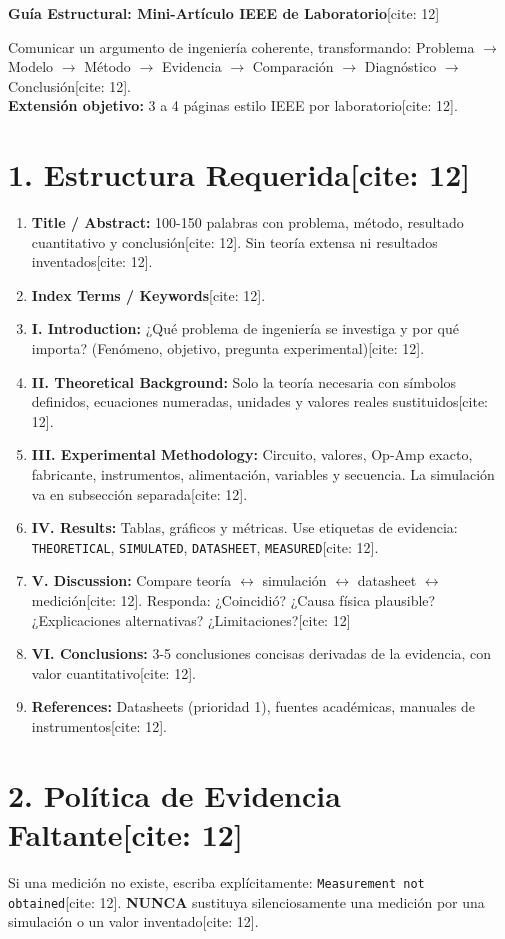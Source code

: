\documentclass[11pt, a4paper]{article}
\begin{document}
\begin{center}
    \Large\textbf{\textcolor{ucbblue}{Guía Estructural: Mini-Artículo IEEE de Laboratorio}}[cite: 12]
\end{center}

\begin{tcolorbox}[colback=white, colframe=ucbblue, title=\textbf{Propósito del Informe[cite: 12]}]
    Comunicar un argumento de ingeniería coherente, transformando: Problema $\rightarrow$ Modelo $\rightarrow$ Método $\rightarrow$ Evidencia $\rightarrow$ Comparación $\rightarrow$ Diagnóstico $\rightarrow$ Conclusión[cite: 12]. \\
    \textbf{Extensión objetivo:} 3 a 4 páginas estilo IEEE por laboratorio[cite: 12].
\end{tcolorbox}

\section*{1. Estructura Requerida[cite: 12]}
\begin{enumerate}
    \setlength{\itemsep}{0pt}
    \item \textbf{Title / Abstract:} 100-150 palabras con problema, método, resultado cuantitativo y conclusión[cite: 12]. Sin teoría extensa ni resultados inventados[cite: 12].
    \item \textbf{Index Terms / Keywords}[cite: 12].
    \item \textbf{I. Introduction:} ¿Qué problema de ingeniería se investiga y por qué importa? (Fenómeno, objetivo, pregunta experimental)[cite: 12].
    \item \textbf{II. Theoretical Background:} Solo la teoría necesaria con símbolos definidos, ecuaciones numeradas, unidades y valores reales sustituidos[cite: 12].
    \item \textbf{III. Experimental Methodology:} Circuito, valores, Op-Amp exacto, fabricante, instrumentos, alimentación, variables y secuencia. La simulación va en subsección separada[cite: 12].
    \item \textbf{IV. Results:} Tablas, gráficos y métricas. Use etiquetas de evidencia: \texttt{THEORETICAL}, \texttt{SIMULATED}, \texttt{DATASHEET}, \texttt{MEASURED}[cite: 12].
    \item \textbf{V. Discussion:} Compare teoría $\leftrightarrow$ simulación $\leftrightarrow$ datasheet $\leftrightarrow$ medición[cite: 12]. Responda: ¿Coincidió? ¿Causa física plausible? ¿Explicaciones alternativas? ¿Limitaciones?[cite: 12]
    \item \textbf{VI. Conclusions:} 3-5 conclusiones concisas derivadas de la evidencia, con valor cuantitativo[cite: 12].
    \item \textbf{References:} Datasheets (prioridad 1), fuentes académicas, manuales de instrumentos[cite: 12].
\end{enumerate}

\section*{2. Política de Evidencia Faltante[cite: 12]}
Si una medición no existe, escriba explícitamente: \texttt{Measurement not obtained}[cite: 12]. \textbf{NUNCA} sustituya silenciosamente una medición por una simulación o un valor inventado[cite: 12].
\end{document}
